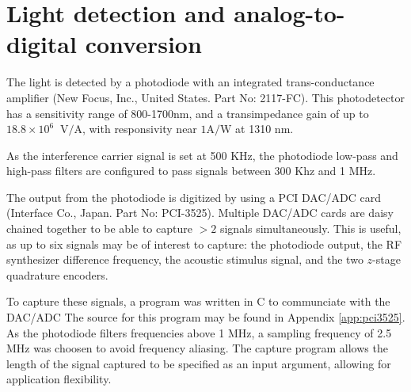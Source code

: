 \section{Light detection and analog-to-digital conversion}

The light is detected by a photodiode with an integrated trans-conductance amplifier (New Focus, Inc., United States. Part No: 2117-FC). This photodetector has a sensitivity range of 800-1700nm, and a transimpedance gain of up to $18.8 \times 10^6 \;\; \mathrm{V}/\mathrm{A}$, with responsivity near $1 \mathrm{A}/\mathrm{W}$ at 1310 nm. %

As the interference carrier signal is set at 500 KHz, the photodiode low-pass and high-pass filters are configured to pass signals between 300 Khz and 1 MHz.



The output from the photodiode is digitized by using a PCI DAC/ADC card (Interface Co., Japan. Part No: PCI-3525). Multiple DAC/ADC cards are daisy chained together to be able to capture $>2$ signals simultaneously. This is useful, as up to six signals may be of interest to capture: the photodiode output, the RF synthesizer difference frequency, the acoustic stimulus signal, and the two $z$-stage quadrature encoders.

To capture these signals, a program was written in C to communciate with the DAC/ADC The source for this program may be found in Appendix \ref{app:pci3525}. As the photodiode filters frequencies above 1 MHz, a sampling frequency of 2.5 MHz was choosen to avoid frequency aliasing. The capture program allows the length of the signal captured to be specified as an input argument, allowing for application flexibility.

